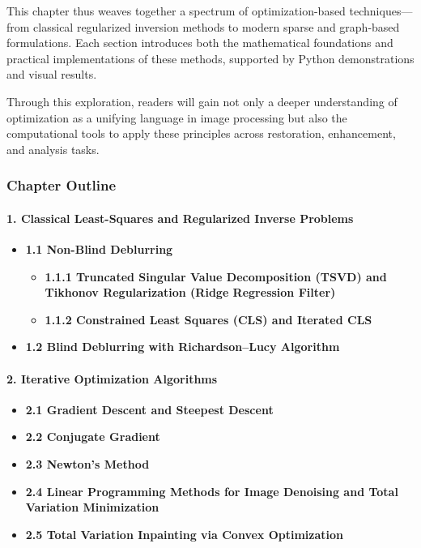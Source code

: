 \documentclass[11pt]{article}
\providecommand{\tightlist}{%
      \setlength{\itemsep}{0pt}\setlength{\parskip}{0pt}}
\begin{document}
This chapter thus weaves together a spectrum of optimization-based
techniques---from classical regularized inversion methods to modern
sparse and graph-based formulations. Each section introduces both the
mathematical foundations and practical implementations of these methods,
supported by Python demonstrations and visual results.

Through this exploration, readers will gain not only a deeper
understanding of optimization as a unifying language in image processing
but also the computational tools to apply these principles across
restoration, enhancement, and analysis tasks.

\hypertarget{chapter-outline}{%
\subsubsection{\texorpdfstring{\textbf{Chapter
Outline}}{Chapter Outline}}\label{chapter-outline}}

\hypertarget{classical-least-squares-and-regularized-inverse-problems}{%
\paragraph{1. Classical Least-Squares and Regularized Inverse
Problems}\label{classical-least-squares-and-regularized-inverse-problems}}

\begin{itemize}
\tightlist
\item
  \textbf{1.1 Non-Blind Deblurring}

  \begin{itemize}
  \tightlist
  \item
    \textbf{1.1.1 Truncated Singular Value Decomposition (TSVD) and
    Tikhonov Regularization (Ridge Regression Filter)}
  \item
    \textbf{1.1.2 Constrained Least Squares (CLS) and Iterated CLS}
  \end{itemize}
\item
  \textbf{1.2 Blind Deblurring with Richardson--Lucy Algorithm}
\end{itemize}

\hypertarget{iterative-optimization-algorithms}{%
\paragraph{2. Iterative Optimization
Algorithms}\label{iterative-optimization-algorithms}}

\begin{itemize}
\tightlist
\item
  \textbf{2.1 Gradient Descent and Steepest Descent}
\item
  \textbf{2.2 Conjugate Gradient}
\item
  \textbf{2.3 Newton's Method}
\item
  \textbf{2.4 Linear Programming Methods for Image Denoising and Total
  Variation Minimization}
\item
  \textbf{2.5 Total Variation Inpainting via Convex Optimization}
\end{itemize}
\end{document}
